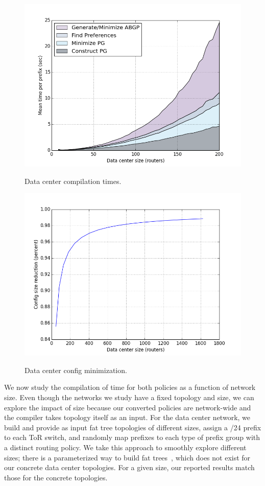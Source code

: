 \begin{figure}[t!]
\centering
\includegraphics[width=\columnwidth]{figures/compilation-times-backbone.png}
\label{fig:compilation-times-dc}
\caption{Data center compilation times.}
\end{figure}

\begin{figure}[t!]
\centering
\includegraphics[width=\columnwidth]{figures/config-compression-dc.png}
\label{fig:compilation-compression-dc}
\caption{Data center config minimization.}
\end{figure} 

We now study the compilation of time for both policies as a function of network size. Even though the networks we study have a fixed topology and size, we can explore the impact of size because our converted policies are network-wide and the compiler takes topology itself as an input. For the data center network, we build and provide as input fat tree topologies of different sizes, assign a /24 prefix to each ToR switch, and randomly map prefixes to each type of prefix group with a distinct routing policy. We take this approach to smoothly explore different sizes; there is a parameterized way to build fat trees~\cite{fattree}, which does not exist for our concrete data center topologies. For a given size, our reported results match those for the concrete topologies.

